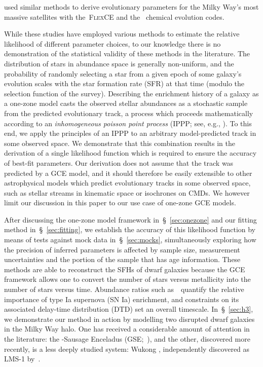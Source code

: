 \documentclass[foo.tex]{subfiles}
\begin{document}
\citet{Hasselquist2021} used similar methods to derive evolutionary parameters
for the Milky Way's most massive satellites with the~\textsc{FlexCE}
\citep{Andrews2017} and the~\citet{Lian2018, Lian2020} chemical evolution
codes.
\par
While these studies have employed various methods to estimate the relative
likelihood of different parameter choices, to our knowledge there is no
demonstration of the statistical validity of these methods in the literature.
The distribution of stars in abundance space is generally non-uniform, and the
probability of randomly selecting a star from a given epoch of some galaxy's
evolution scales with the star formation rate (SFR) at that time (modulo the
selection function of the survey).
Describing the enrichment history of a galaxy as a one-zone model casts the
observed stellar abundances as a stochastic sample from the predicted
evolutionary track, a process which proceeds mathematically according to an
\textit{inhomogeneous poisson point process} (IPPP; see, e.g.,
\citealt{Press2007}).
To this end, we apply the principles of an IPPP to an arbitrary model-predicted
track in some observed space.
We demonstrate that this combination results in the derivation of a single
likelihood function which is required to ensure the accuracy of best-fit
parameters.
Our derivation does not assume that the track was predicted by a GCE model,
and it should therefore be easily extensible to other astrophysical models
which predict evolutionary tracks in some observed space, such as stellar
streams in kinematic space or isochrones on CMDs.
We however limit our discussion in this paper to our use case of one-zone GCE
models.
\par
After discussing the one-zone model framework in~\S~\ref{sec:onezone} and
our fitting method in~\S~\ref{sec:fitting}, we establish the accuracy of this
likelihood function by means of tests against mock data in~\S~\ref{sec:mocks},
simultaneously exploring how the precision of inferred parameters is affected
by sample size, measurement uncertainties and the portion of the sample that
has age information.
These methods are able to reconstruct the SFHs of dwarf galaxies because the
GCE framework allows one to convert the number of stars versus metallicity into
the number of stars versus time.
Abundance ratios such as~\afe~quantify the relative importance of type Ia
supernova (SN Ia) enrichment, and constraints on its associated delay-time
distribution (DTD) set an overall timescale.
In~\S~\ref{sec:h3}, we demonstrate our method in action by modelling two
disrupted dwarf galaxies in the Milky Way halo.
One has received a considerable amount of attention in the literature: the
\gaia-Sausage Enceladus (GSE;~\citealp{Belokurov2018, Helmi2018}), and the
other, discovered more recently, is a less deeply studied system: Wukong
\citep{Naidu2020, Naidu2022}, independently discovered as LMS-1
by~\citet{Yuan2020}.
\end{document}
